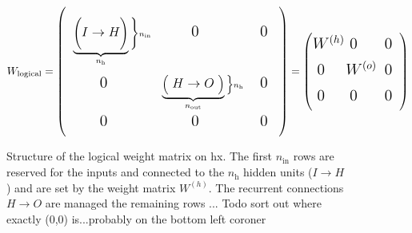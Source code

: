 \begin{figure}
\[
\sbox0{$\begin{matrix}1&2&3\\0&1&1\\0&0&1\\0&0&1\end{matrix}$}
\sbox1{$\begin{matrix}1&2&3\\0&1&1\\0&0&1\end{matrix}$}
\sbox2{$\begin{matrix}1&2\\0&1\end{matrix}$}
%
W_\text{logical}=\left(
\begin{array}{c c c}
\vphantom{\usebox{0}}\underbrace{\Bigg(\makebox[\wd0]{\large$I \rightarrow H$}\Bigg)}_{n_\text{h}}\Bigg\}\scriptstyle{n_\text{in}}&
\makebox[\wd0]{\Large0\quad} & 
\makebox[0.5\wd0]{\Large0}\\
\vphantom{\usebox{1}}	\makebox[\wd1]{\Large0\quad}&
\underbrace{\Big(\makebox[1.3\wd0]{\large$H \rightarrow O$}\Big)}_{n_\text{out}}\Big\}\scriptstyle{n_\text{h}} &
\makebox[0.5\wd1]{\Large0}\\

\vphantom{\usebox{2}}	\makebox[\wd2]{\Large0\quad}&
\makebox[\wd2]{\Large0\quad}&
\makebox[0.5\wd2]{\Large0}

\end{array}
\right)
=
\left(
\begin{array}{c c c}
\vphantom{\usebox{2}}\makebox[\wd2]{\Large$W^{(h)}$}&
\makebox[\wd2]{\Large0\quad} & 
\makebox[0.5\wd2]{\Large0}\\
\vphantom{\usebox{2}}	\makebox[\wd2]{\Large0\quad}&
\makebox[\wd2]{\Large$W^{(o)}$} &
\makebox[0.5\wd2]{\Large0}\\
\vphantom{\usebox{2}}	\makebox[\wd2]{\Large0\quad}&
\makebox[\wd2]{\Large0\quad} &
\makebox[0.5\wd2]{\Large0}

\end{array}
\right)
	\]
\caption[Structure of the logical weight matrix on \gls{hx}]{Structure of the logical weight matrix on \gls{hx}. The first $n_\text{in}$ rows are reserved for the inputs and connected to the $n_\text{h}$ hidden units ($I\rightarrow H$) and are set by the weight matrix $W^{(h)}$. The recurrent connections  $H\rightarrow O $ are managed the remaining rows ... Todo sort out where exactly (0,0) is...probably on the bottom left coroner}
\label{hxnetworksetup}
\end{figure}

